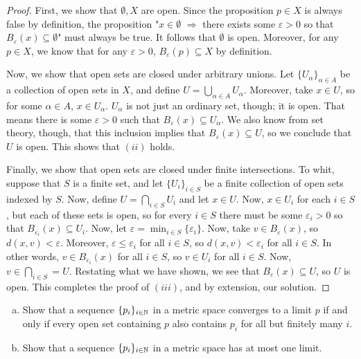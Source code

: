 \documentclass[./main.tex]{subfiles}
\begin{document}
\begin{proof}
    First, we show that $\emptyset, X$ are open. Since the proposition $p\in X$ is always false by definition, the
    proposition "$x\in \emptyset$ $\Rightarrow$ there exists some $\varepsilon>0$ so that $B_\varepsilon(x)\subseteq\emptyset$" 
    must always be true. It follows that $\emptyset$ is open. Moreover, for any $p\in X$, we know that for any 
    $\varepsilon>0$, $B_\varepsilon(p)\subseteq X$ by definition.

    Now, we show that open sets are closed under arbitrary unions. Let $\{U_\alpha\}_{\alpha\in A}$ be a collection of
    open sets in $X$, and define $U = \bigcup_{\alpha\in A}U_\alpha$. Moreover, take $x\in U$, so for some 
    $\alpha\in A$, $x\in U_\alpha$. $U_\alpha$ is not just an ordinary set, though; it is open. That means there 
    is some $\varepsilon>0$ such that $B_\varepsilon(x)\subseteq U_\alpha$. We also know from set theory, though, 
    that this inclusion implies that $B_\varepsilon(x)\subseteq U$, so we conclude that $U$ is open. This shows that $(ii)$ holds.

    Finally, we show that open sets are closed under finite intersections. To whit, suppose that $S$ is a finite set, 
    and let $\{U_i\}_{i\in S}$ be a finite collection of open sets indexed by $S$. Now, define $U=\bigcap_{i\in S}U_i$ and
    let $x\in U$. Now, $x\in U_i$ for each $i\in S$, but each of these sets is open, so for every $i\in S$ there must be some 
    $\varepsilon_i>0$ so that $B_{\varepsilon_i}(x)\subseteq U_i$. Now, let $\varepsilon = \min_{i\in S}\{\varepsilon_i\}$.
    Now, take $v\in B_\varepsilon(x)$, so $d(x,v)<\varepsilon$. Moreover, $\varepsilon\leq \varepsilon_i$ for all $i\in S$,
    so $d(x,v)<\varepsilon_i$ for all $i\in S$. In other words, $v\in B_{\varepsilon_i}(x)$ for all $i\in S$, so $v\in U_i$ 
    for all $i\in S$. Now, $v\in \bigcap_{i\in S}=U$. Restating what we have shown, we see that $B_{\varepsilon}(x)\subseteq U$,
    so $U$ is open. This completes the proof of $(iii)$, and by extension, our solution.
\end{proof}

\begin{fprob}
    \begin{enumerate}[(a)]
        \item Show that a sequence $\{p_i\}_{i\in\mathbb{N}}$ in a metric space converges 
        to a limit $p$ if and only if every open set containing $p$ also contains $p_i$ 
        for all but finitely many $i$.
        \item Show that a sequence $\{p_i\}_{i\in\mathbb{N}}$ in a metric space has at most one limit.
    \end{enumerate}
\end{fprob}
\end{document}
